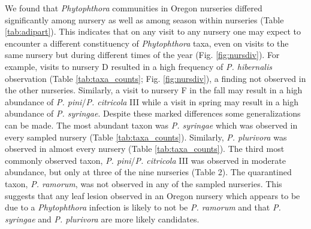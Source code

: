\documentclass[12pt]{article}
\begin{document}
We found that \emph{Phytophthora} communities in Oregon nurseries differed significantly among nursery as well as among season within nurseries (Table \ref{tab:adipart}).  This indicates that on any visit to any nursery one may expect to encounter a different constituency of \emph{Phytophthora} taxa, even on visits to the same nursery but during different times of the year (Fig. \ref{fig:nursdiv}).  For example, visits to nursery D resulted in a high frequency of \emph{P. hibernalis} observation (Table \ref{tab:taxa_counts}; Fig. \ref{fig:nursdiv}), a finding not observed in the other nurseries.  Similarly, a visit to nursery F in the fall may result in a high abundance of \emph{P. pini}/\emph{P. citricola} III while a visit in spring may result in a high abundance of \emph{P. syringae}.  Despite these marked differences some generalizations can be made.  The most abundant taxon was \emph{P. syringae} which was observed in every sampled nursery (Table \ref{tab:taxa_counts}).  Similarly, \emph{P. plurivora} was observed in almost every nursery (Table \ref{tab:taxa_counts}).  The third most commonly observed taxon, \emph{P. pini}/\emph{P. citricola} III was observed in moderate abundance, but only at three of the nine nurseries (Table 2).  The quarantined taxon, \emph{P. ramorum}, was not observed in any of the sampled nurseries.  This suggests that any leaf lesion observed in an Oregon nursery which appears to be due to a \emph{Phytophthora} infection is likely to not be \emph{P. ramorum} and that \emph{P. syringae} and \emph{P. plurivora} are more likely candidates.

\end{document}
